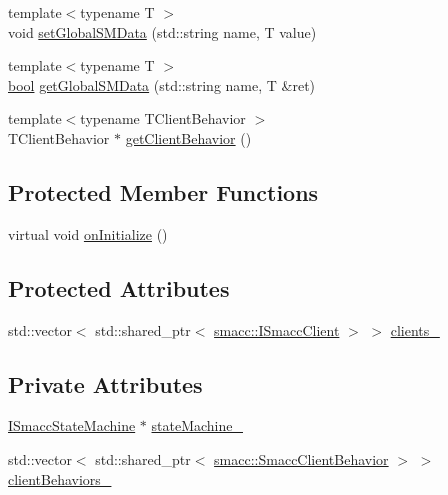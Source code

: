 \begin{DoxyCompactItemize}
\item 
{\footnotesize template$<$typename T $>$ }\\void \hyperlink{classsmacc_1_1IOrthogonal_a7592b847691e32c6dee28f36a3bd1771}{set\+Global\+S\+M\+Data} (std\+::string name, T value)
\item 
{\footnotesize template$<$typename T $>$ }\\\hyperlink{classbool}{bool} \hyperlink{classsmacc_1_1IOrthogonal_a96688175d9d570dd56fd43435b5739ed}{get\+Global\+S\+M\+Data} (std\+::string name, T \&ret)
\item 
{\footnotesize template$<$typename T\+Client\+Behavior $>$ }\\T\+Client\+Behavior $\ast$ \hyperlink{classsmacc_1_1IOrthogonal_a77a3355d9ad40c1a937d0b2cd23bd581}{get\+Client\+Behavior} ()
\end{DoxyCompactItemize}
\subsection*{Protected Member Functions}
\begin{DoxyCompactItemize}
\item 
virtual void \hyperlink{classsmacc_1_1IOrthogonal_ad21074708f877791f5604916dfd3b917}{on\+Initialize} ()
\end{DoxyCompactItemize}
\subsection*{Protected Attributes}
\begin{DoxyCompactItemize}
\item 
std\+::vector$<$ std\+::shared\+\_\+ptr$<$ \hyperlink{classsmacc_1_1ISmaccClient}{smacc\+::\+I\+Smacc\+Client} $>$ $>$ \hyperlink{classsmacc_1_1IOrthogonal_ad3e5fb55db8c40ff178b22c92c9c9cd3}{clients\+\_\+}
\end{DoxyCompactItemize}
\subsection*{Private Attributes}
\begin{DoxyCompactItemize}
\item 
\hyperlink{classsmacc_1_1ISmaccStateMachine}{I\+Smacc\+State\+Machine} $\ast$ \hyperlink{classsmacc_1_1IOrthogonal_a6c62a3a971d827d0b2c0b273a49a2129}{state\+Machine\+\_\+}
\item 
std\+::vector$<$ std\+::shared\+\_\+ptr$<$ \hyperlink{classsmacc_1_1SmaccClientBehavior}{smacc\+::\+Smacc\+Client\+Behavior} $>$ $>$ \hyperlink{classsmacc_1_1IOrthogonal_a8e3a85158f85978f8cc01cca7b1d4091}{client\+Behaviors\+\_\+}
\end{DoxyCompactItemize}



